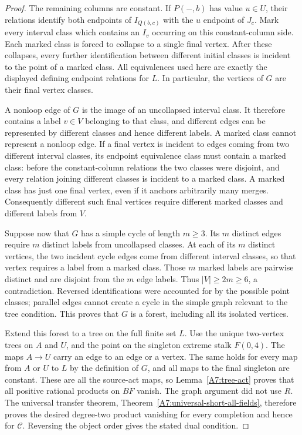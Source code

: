 \begin{proof}
The remaining columns are constant. If $P(-,b)$ has value
$u\in U$, their relations identify both endpoints of
$I_{Q(b,c)}$ with the $u$ endpoint of $J_c$. Mark every
interval class which contains an $I_v$ occurring on this
constant-column side. Each marked class is forced to collapse
to a single final vertex. After these collapses, every further
identification between different initial classes is incident to
the point of a marked class. All equivalences used here are
exactly the displayed defining endpoint relations for $L$.
In particular, the vertices of $G$ are their final vertex classes.

A nonloop edge of $G$ is the image of an uncollapsed interval
class. It therefore contains a label $v\in V$ belonging to
that class, and different edges can be represented by different
classes and hence different labels. A marked class cannot
represent a nonloop edge.
If a final vertex is incident to edges coming from two different
interval classes, its endpoint equivalence class must contain
a marked class: before the constant-column relations the two
classes were disjoint, and every relation joining different
classes is incident to a marked class. A marked class has just
one final vertex, even if it anchors arbitrarily many merges.
Consequently different such final vertices require different
marked classes and different labels from $V$.

Suppose now that $G$ has a simple cycle of length $m\geq3$.
Its $m$ distinct edges require $m$ distinct labels from
uncollapsed classes. At each of its $m$ distinct vertices,
the two incident cycle edges come from different interval
classes, so that vertex requires a label from a marked class.
Those $m$ marked labels are pairwise distinct and are disjoint
from the $m$ edge labels. Thus $|V|\geq2m\geq6$, a
contradiction. Reversed identifications were accounted for by
the possible point classes; parallel edges cannot create a
cycle in the simple graph relevant to the tree condition.
This proves that $G$ is a forest, including all its isolated
vertices.

Extend this forest to a tree on the full finite set $L$.
Use the unique two-vertex trees on $A$ and $U$, and the point
on the singleton extreme stalk $F(0,4)$. The maps $A\to U$
carry an edge to an edge or a vertex. The same holds for every
map from $A$ or $U$ to $L$ by the definition of $G$, and all
maps to the final singleton are constant. These are all the
source-act maps, so Lemma~\ref{A7:tree-act} proves that all
positive rational products on $BF$ vanish. The graph argument
did not use $R$. The universal transfer theorem,
Theorem~\ref{A7:universal-short-all-fields}, therefore proves
the desired degree-two product vanishing for every completion
and hence for $\mathcal C$. Reversing the object order gives
the stated dual condition.
\end{proof}
